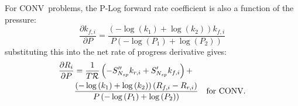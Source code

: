 \documentclass[12pt]{article}
\newcommand{\ns}{N_{sp}}
\newcommand{\conv}{CONV}
\newcommand{\dconv}{\ifmmode\text{for \conv,}\else for \conv.\fi}
\newcommand{\Ru}{\mathcal{R}}
\begin{document}
For \conv~problems, the P-Log forward rate coefficient is also a function of the pressure:
\begin{equation}
 \frac{\partial {k_{f, i}} }{\partial P } = \frac{\left(- \log{\left (k_{1} \right )} + \log{\left (k_{2} \right )}\right) {k_{f, i}}}{P \left(- \log{\left (P_{1} \right )} + \log{\left (P_{2} \right )}\right)}
\end{equation}
substituting this into the net rate of progress derivative gives:
\begin{align}
 \frac{\partial R_{i} }{\partial P } &= \frac{1}{T \Ru} \left(- S^{\prime\prime}_{\ns} {k_{r, i}} + S^{\prime}_{\ns} {k_{f, i}}\right) + & \nonumber \\
				     &  \frac{\left(- \log{\left (k_{1} \right )} + \log{\left (k_{2} \right )}\right) \left({R_{f, i}} - {R_{r, i}}\right)}{P \left(- \log{\left (P_{1} \right )} + \log{\left (P_{2} \right )}\right)} & \text{\dconv}
\end{align}
\end{document}
